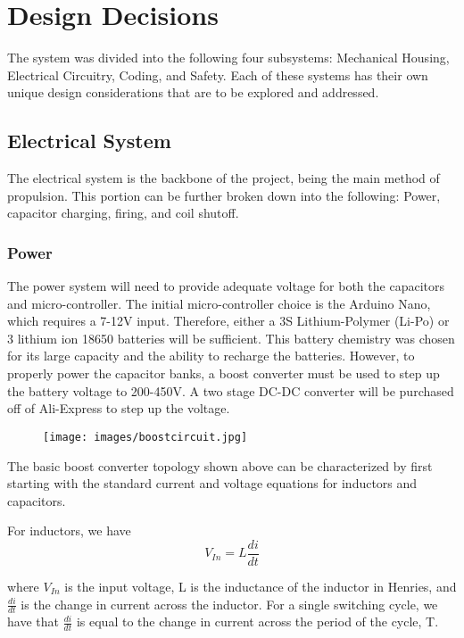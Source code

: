\chapter{Design Decisions}
The system was divided into the following four subsystems: Mechanical Housing, Electrical Circuitry, Coding, and Safety. Each of these systems has their own unique design considerations that are to be explored and addressed.

\section{Electrical System}

The electrical system is the backbone of the project, being the main method of propulsion. This portion can be further broken down into the following: Power, capacitor charging, firing, and coil shutoff.

\subsection{Power}

The power system will need to provide adequate voltage for both the capacitors and micro-controller. The initial micro-controller choice is the Arduino Nano, which requires a 7-12V input. Therefore, either a 3S Lithium-Polymer (Li-Po) or 3 lithium ion 18650 batteries will be sufficient. This battery chemistry was chosen for its large capacity and the ability to recharge the batteries. However, to properly power the capacitor banks, a boost converter must be used to step up the battery voltage to 200-450V. A two stage DC-DC converter will be purchased off of Ali-Express to step up the voltage.

\begin{figure}
	\texttt{[image: images/boostcircuit.jpg]}
\end{figure}

The basic boost converter topology shown above can be characterized by first starting with the standard current and voltage equations for inductors and capacitors. 

For inductors, we have 
\begin{equation}
	V_{In}=L\frac{di}{dt}
\end{equation}

where \(V_{In}\) is the input voltage, L is the inductance of the inductor in Henries, and \(\frac{di}{dt}\) is the change in current across the inductor. For a single switching cycle, we have that \(\frac{di}{dt}\) is equal to the change in current across the period of the cycle, T. 

